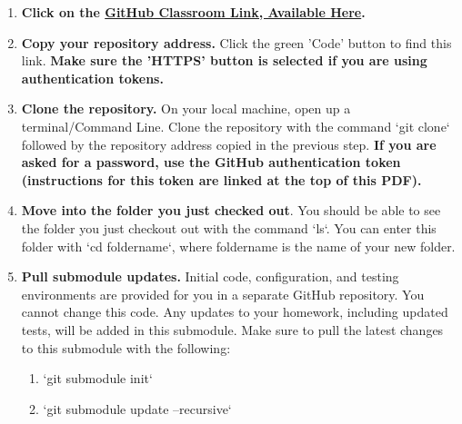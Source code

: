 \documentclass{article} %
\begin{document}

\rickroll



\begin{enumerate} 
    \item \textbf{Click on the \href{}{GitHub Classroom Link, Available Here}.}
    
    \item \textbf{Copy your repository address.} Click the green 'Code' button to find this link.  \textbf{Make sure the 'HTTPS' button is selected if you are using authentication tokens.}    
    
    \item \textbf{Clone the repository.}  On your local machine, open up a terminal/Command Line.  Clone the repository with the command `git clone` followed by the repository address copied in the previous step.  \textbf{If you are asked for a password, use the GitHub authentication token (instructions for this token are linked at the top of this PDF).}
    

    \item \textbf{Move into the folder you just checked out}.  You should be able to see the folder you just checkout out with the command `ls`.  You can enter this folder with `cd foldername`, where foldername is the name of your new folder.
    
    \item \textbf{Pull submodule updates.}  Initial code, configuration, and testing environments are provided for you in a separate GitHub repository.  You cannot change this code.  Any updates to your homework, including updated tests, will be added in this submodule.  Make sure to pull the latest changes to this submodule with the following:
    \begin{enumerate}
        \item `git submodule init`
        \item `git submodule update --recursive`
    \end{enumerate}
\end{enumerate}
\end{document}
